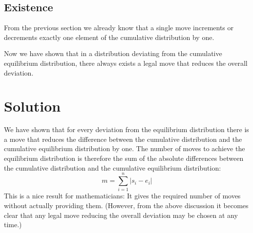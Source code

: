 \documentclass{article}
\begin{document}
\subsection*{Existence}
From the previous section we already know that a single move
increments or decrements exactly one element of the cumulative
distribution by one. 

Now we have shown that in a distribution deviating from the
cumulative equilibrium distribution, there always exists a legal
move that reduces the overall deviation. 

\section*{Solution}
We have shown that for every deviation from the equilibrium
distribution there is a move that reduces the difference between the
cumulative distribution and the cumulative equilibrium distribution by
one.
The number of moves to achieve the equilibrium distribution is
therefore the sum of the absolute differences between the cumulative
distribution and the cumulative equilibrium distribution:
\begin{displaymath}
  m = \sum_{i=1}^n |s_i - e_i|
\end{displaymath}
This is a nice result for mathematicians: It gives the required number
of moves without actually providing them.
(However, from the above discussion it becomes clear that any legal
move reducing the overall deviation may be chosen at any time.)
\end{document}
